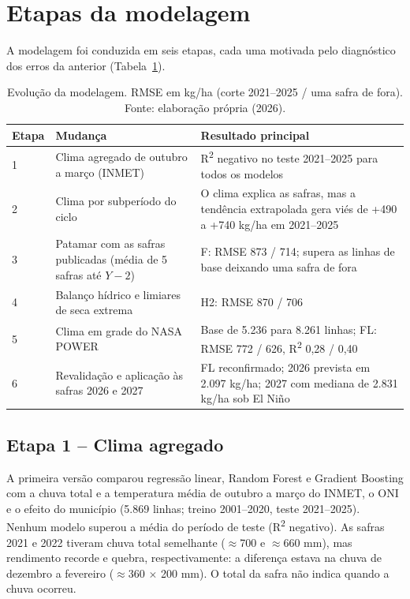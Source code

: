 \documentclass[12pt]{article}
\begin{document}
\section{Etapas da modelagem}

A modelagem foi conduzida em seis etapas, cada uma motivada pelo
diagnóstico dos erros da anterior (Tabela~\ref{tab:etapas}).

\begin{table}[ht]
\centering
\caption{Evolução da modelagem. RMSE em kg/ha (corte 2021--2025 / uma
  safra de fora). Fonte: elaboração própria (2026).}
\label{tab:etapas}
\begin{tabular}{|p{1.1cm}|p{4.7cm}|p{7.6cm}|}
\hline
\textbf{Etapa} & \textbf{Mudança} & \textbf{Resultado principal} \\ \hline
1 & Clima agregado de outubro a março (INMET) & R\textsuperscript{2}
  negativo no teste 2021--2025 para todos os modelos \\ \hline
2 & Clima por subperíodo do ciclo & O clima explica as safras, mas a
  tendência extrapolada gera viés de +490 a +740 kg/ha em 2021--2025
  \\ \hline
3 & Patamar com as safras publicadas (média de 5 safras até $Y-2$) & F:
  RMSE 873 / 714; supera as linhas de base deixando uma safra de fora
  \\ \hline
4 & Balanço hídrico e limiares de seca extrema & H2: RMSE 870 / 706
  \\ \hline
5 & Clima em grade do NASA POWER & Base de 5.236 para 8.261 linhas; FL:
  RMSE 772 / 626, R\textsuperscript{2} 0,28 / 0,40 \\ \hline
6 & Revalidação e aplicação às safras 2026 e 2027 & FL reconfirmado; 2026
  prevista em 2.097 kg/ha; 2027 com mediana de 2.831 kg/ha sob El Niño
  \\ \hline
\end{tabular}
\end{table}

\subsection{Etapa 1 -- Clima agregado}

A primeira versão comparou regressão linear, Random Forest e Gradient
Boosting com a chuva total e a temperatura média de outubro a março do
INMET, o ONI e o efeito do município (5.869 linhas; treino 2001--2020,
teste 2021--2025). Nenhum modelo superou a média do período de teste
(R\textsuperscript{2} negativo). As safras 2021 e 2022 tiveram chuva
total semelhante ($\approx$700 e $\approx$660 mm), mas rendimento recorde
e quebra, respectivamente: a diferença estava na chuva de dezembro a
fevereiro ($\approx$360 $\times$ 200 mm). O total da safra não indica
quando a chuva ocorreu.
\end{document}

